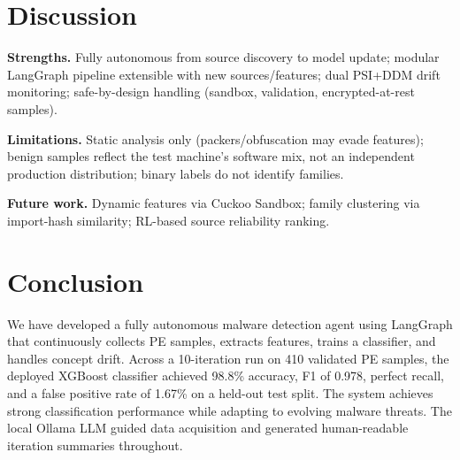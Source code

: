 \documentclass[12pt,a4paper]{article}
\begin{document}
\section{Discussion}
\label{sec:discussion}

\textbf{Strengths.} Fully autonomous from source discovery to model update; modular LangGraph pipeline extensible with new sources/features; dual PSI+DDM drift monitoring; safe-by-design handling (sandbox, validation, encrypted-at-rest samples).

\textbf{Limitations.} Static analysis only (packers/obfuscation may evade features); benign samples reflect the test machine's software mix, not an independent production distribution; binary labels do not identify families.

\textbf{Future work.} Dynamic features via Cuckoo Sandbox; family clustering via import-hash similarity; RL-based source reliability ranking.

\section{Conclusion}
\label{sec:conclusion}

We have developed a fully autonomous malware detection agent using LangGraph that continuously collects PE samples, extracts features, trains a classifier, and handles concept drift. Across a 10-iteration run on 410 validated PE samples, the deployed XGBoost classifier achieved 98.8\% accuracy, F1 of 0.978, perfect recall, and a false positive rate of 1.67\% on a held-out test split. The system achieves strong classification performance while adapting to evolving malware threats. The local Ollama LLM guided data acquisition and generated human-readable iteration summaries throughout.

\newpage
\printbibliography
\end{document}

